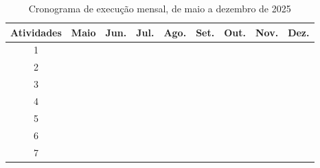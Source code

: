 \documentclass[11pt]{article}
\begin{document}
\begin{table}[h]
    \centering
    \begin{tabular}{|c|c|c|c|c|c|c|c|c|}  
    \hline
    Atividades&Maio&Jun.&Jul.&Ago.&Set.&Out.&Nov.&Dez. \\
    \hline
    1&\cellcolor{black!100}& \cellcolor{black!100} & & & & & &\\
    \hline
    2& \cellcolor{black!100} & \cellcolor{black!100}&&&&&&\\
    \hline
    3&&\cellcolor{black!100}&\cellcolor{black!100}&&&&&\\
    \hline
    4&&&\cellcolor{black!100}&\cellcolor{black!100}&\cellcolor{black!100}&&&\\
    \hline
    5&&&&&\cellcolor{black!100}&\cellcolor{black!100}&&\\
    \hline
    6&&&&&&\cellcolor{black!100}&&\\
    \hline
    7&&&&&&\cellcolor{black!100}&\cellcolor{black!100}&\\
    \hline
    \end{tabular}
    \caption{Cronograma de execução mensal, de maio a dezembro de 2025}
    \label{table:Cronograma}
\end{table}

 

\end{document}
